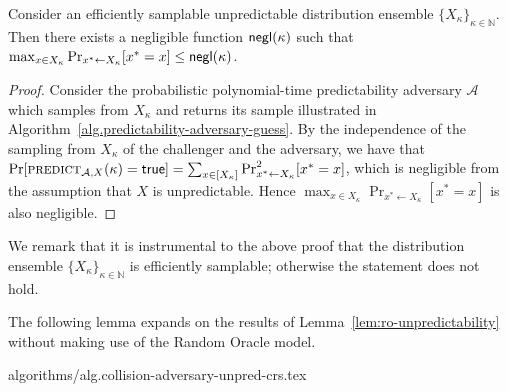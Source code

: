 \begin{lemma}\label{lem:unpred-negl}
  Consider an efficiently samplable unpredictable distribution ensemble $\{X_\kappa\}_{\kappa\in\mathbb{N}}$. Then there exists a negligible function $\textsf{negl}(\kappa)$ such that $\max_{x \in X_\kappa}\Pr_{x^* \gets X_\kappa}[x^* = x] \leq \textsf{negl}(\kappa)$.
\end{lemma}
\begin{proof}
  Consider the probabilistic polynomial-time predictability adversary $\mathcal{A}$ which samples from $X_\kappa$ and returns its sample illustrated in Algorithm~\ref{alg.predictability-adversary-guess}. By the independence of the
  sampling from $X_\kappa$ of the challenger and the adversary, we have that
  $\Pr[\textsc{predict}_{\mathcal{A},X}(\kappa) = \mathsf{true}]
   = \sum_{x \in [X_\kappa]} \Pr^2_{x^* \gets X_\kappa}[x^* = x]$,
  which is negligible from the assumption that $X$ is unpredictable. Hence
  $\max_{x \in X_\kappa}\Pr_{x^* \gets X_\kappa}[x^* = x]$ is also negligible.
\end{proof}

We remark that it is instrumental to the above proof that the distribution ensemble $\{X_\kappa\}_{\kappa\in\mathbb{N}}$ is efficiently samplable; otherwise the statement does not hold.

The following lemma expands on the results of Lemma~\ref{lem:ro-unpredictability} without making use of the Random Oracle model.

{algorithms/alg.collision-adversary-unpred-crs.tex}

\newcommand{\collstar}{\textsc{Coll}_{h^*}}

